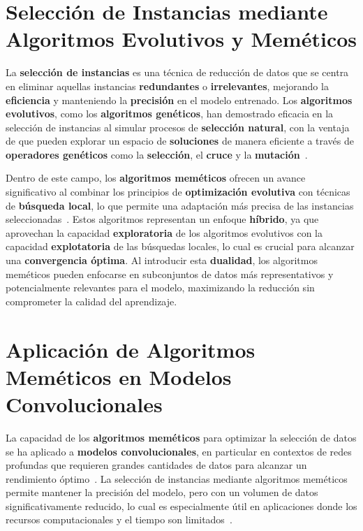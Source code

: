 \section{Selección de Instancias mediante Algoritmos Evolutivos y Meméticos}
\label{sec:seleccion-de-instancias-mediante-algoritmos-evolutivos-y-memeticos}
La \textbf{selección de instancias} es una técnica de reducción de datos que se centra en eliminar aquellas instancias
\textbf{redundantes} o \textbf{irrelevantes}, mejorando la \textbf{eficiencia} y manteniendo la \textbf{precisión} en
el modelo entrenado.
Los \textbf{algoritmos evolutivos}, como los \textbf{algoritmos genéticos}, han demostrado eficacia en la selección de
instancias al simular procesos de \textbf{selección natural}, con la ventaja de que pueden explorar un espacio de
\textbf{soluciones} de manera eficiente a través de \textbf{operadores genéticos} como la \textbf{selección}, el
\textbf{cruce} y la \textbf{mutación}~\cite{hollandAdaptationNaturalArtificial1975}.


Dentro de este campo, los \textbf{algoritmos meméticos} ofrecen un avance significativo al combinar los principios de
\textbf{optimización evolutiva} con técnicas de \textbf{búsqueda local}, lo que permite una adaptación más precisa de
las instancias seleccionadas~\cite{moscatoEvolutionSearchOptimization2000}.
Estos algoritmos representan un enfoque \textbf{híbrido}, ya que aprovechan la capacidad \textbf{exploratoria} de los
algoritmos evolutivos con la capacidad \textbf{explotatoria} de las búsquedas locales, lo cual es crucial para alcanzar
una \textbf{convergencia óptima}.
Al introducir esta \textbf{dualidad}, los algoritmos meméticos pueden enfocarse en subconjuntos de datos más
representativos y potencialmente relevantes para el modelo, maximizando la reducción sin comprometer la calidad del
aprendizaje.


\section{Aplicación de Algoritmos Meméticos en Modelos Convolucionales}\label{sec:algoritmos-memeticos-en-modelos-convolucionales}
La capacidad de los \textbf{algoritmos meméticos} para optimizar la selección de datos se ha aplicado a
\textbf{modelos convolucionales}, en particular en contextos de redes profundas que requieren grandes cantidades de
datos para alcanzar un rendimiento óptimo~\cite{neriHandbookMemeticAlgorithms2012}.
La selección de instancias mediante algoritmos meméticos permite mantener la precisión del modelo, pero con un volumen
de datos significativamente reducido, lo cual es especialmente útil en aplicaciones donde los recursos computacionales
y el tiempo son
limitados~\cite{dongMemeticAlgorithmEvolving2020}.


